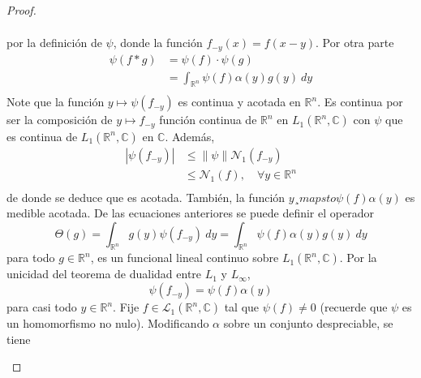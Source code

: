 \documentclass[12pt]{report}
\theoremstyle{largebreak}
\renewcommand{\leq}{\ensuremath{\leqslant}}
\newcommand\abs[1]{\ensuremath{\left|#1\right|}}
\newcommand\norm[1]{\ensuremath{\|#1\|}}
\newcommand{\N}[2]{\ensuremath{\mathcal{N}_{#1}\left(#2\right)}}
\begin{document}
\begin{proof}
\begin{enumerate}
\begin{equation*}
\begin{split}
                \end{split}
            \end{equation*}
            por la definición de $\psi$, donde la función $f_{ -y}(x)=f(x-y)$. Por otra parte
            \begin{equation*}
                \begin{split}
                    \psi(f*g)&=\psi(f)\cdot\psi(g)\\
                    &=\int_{\mathbb{R}^n}\psi(f)\alpha(y)g(y)\:dy\\
                \end{split}
            \end{equation*}
            Note que la función $y\mapsto\psi(f_{ -y})$ es continua y acotada en $\mathbb{R}^n$. Es continua por ser la composición de $y\mapsto f_ {-y}$ función continua de $\mathbb{R}^n$ en $L_1(\mathbb{R}^n,\mathbb{C})$ con $\psi$ que es continua de $L_1(\mathbb{R}^n,\mathbb{C})$ en $\mathbb{C}$. Además,
            \begin{equation*}
                \begin{split}
                    \abs{\psi(f_{ -y})}&\leq\norm{\psi}\N{1}{f_{ -y}}\\
                    &\leq\N{1}{f},\quad\forall y\in\mathbb{R}^n\\
                \end{split}
            \end{equation*}
            de donde se deduce que es acotada. También, la función $y¸mapsto\psi(f)\alpha(y)$ es medible acotada. De las ecuaciones anteriores se puede definir el operador
            \begin{equation*}
                \Theta(g)=\int_{\mathbb{R}^n} g(y)\psi(f_{ -y})\:dy=\int_{\mathbb{R}^n}\psi(f)\alpha(y)g(y)\:dy
            \end{equation*}
            para todo $g\in\mathbb{R}^n$, es un funcional lineal continuo sobre $L_1(\mathbb{R}^n,\mathbb{C})$. Por la unicidad del teorema de dualidad entre $L_1$ y $L_\infty$,
            \begin{equation*}
                \psi(f_{ -y})=\psi(f)\alpha(y)
            \end{equation*}
            para casi todo $y\in\mathbb{R}^n$. Fije $f\in\mathcal{L}_1(\mathbb{R}^n,\mathbb{C})$ tal que $\psi(f)\neq0$ (recuerde que $\psi$ es un homomorfismo no nulo). Modificando $\alpha$ sobre un conjunto despreciable, se tiene
            \begin{equation*}

\end{equation*}
\end{enumerate}
\end{proof}
\end{document}
